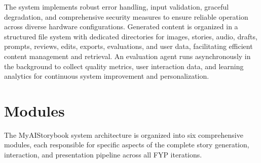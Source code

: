 The system implements robust error handling, input validation, graceful degradation, and comprehensive security measures to ensure reliable operation across diverse hardware configurations. Generated content is organized in a structured file system with dedicated directories for images, stories, audio, drafts, prompts, reviews, edits, exports, evaluations, and user data, facilitating efficient content management and retrieval. An evaluation agent runs asynchronously in the background to collect quality metrics, user interaction data, and learning analytics for continuous system improvement and personalization.

\section{Modules}
The MyAIStorybook system architecture is organized into six comprehensive modules, each responsible for specific aspects of the complete story generation, interaction, and presentation pipeline across all FYP iterations.

